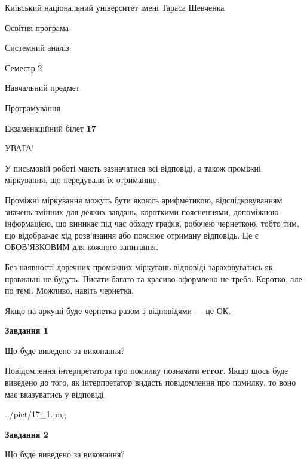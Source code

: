\documentclass[12pt, ukrainian]{article}
\begin{document}
{{\begin {small}\par
{ \center  Київський національний університет імені Тараса Шевченка \par}
{\parbox {5 cm}{Освітня програма \hfill}{\parbox {7 cm}{Системний аналіз \hfill}}\parbox {6 cm}{\hfill Семестр 2}}\par
{\parbox {5 cm} {Навчальний предмет \hfill}\parbox {7 cm}{Програмування \hfill}\parbox {6cm}{\hfill}\par}\vspace{-7pt} \end{small}}{\center Екзаменаційний білет \No \textbf
{ 17 }\par}}
{
\begin {large}
УВАГА!

У письмовій роботі мають зазначатися всі відповіді, а також проміжні міркування, що передували їх отриманню.

Проміжні міркування можуть бути якоюсь арифметикою, відслідковуванням зна\-чень змінних для деяких завдань,
короткими поясненнями, допоміжною інформацією, що виникає під час обходу графів, робочею чернеткою,
тобто тим, що відображає хід розв’язання або пояснює отриману відповідь.
Це є ОБОВ’ЯЗКОВИМ для кожного запитання.

Без наявності доречних проміжних міркувань відповіді зараховуватись як правиль\-ні не будуть.
Писати багато та красиво оформлено не треба. Коротко, але по темі. Можли\-во, навіть чернетка.

Якщо на аркуші буде чернетка разом з відповідями --- це ОК.

\newpage

{\begin {center}\textbf{Завдання 1}\end {center}}\par
Що буде виведено за виконання?

Повідомлення інтерпретатора про помилку позначати \textbf{error}.
Якщо щось буде виведено до того, як інтерпретатор видасть повідомлення про помилку, 
то воно має вказуватись у відповіді. \par


\begin{center}
	{../pict/17_1.png}
\end{center}
\newpage

{\begin {center}\textbf{Завдання 2}\end {center}}\par
Що буде виведено за виконання?


\end{large}}
\end{document}
